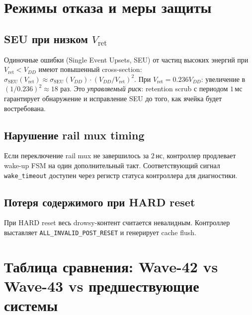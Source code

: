 \section{Режимы отказа и меры защиты}
\label{sec:glava89-failure}

\subsection{SEU при низком $V_\mathrm{ret}$}

Одиночные ошибки (Single Event Upsets, SEU)
от частиц высоких энергий при $V_\mathrm{ret} < V_{DD}$
имеют повышенный cross-section:
$\sigma_\mathrm{SEU}(V_\mathrm{ret}) \approx \sigma_\mathrm{SEU}(V_{DD}) \cdot (V_{DD}/V_\mathrm{ret})^2$.
При $V_\mathrm{ret} = 0.236 V_{DD}$: увеличение в $(1/0.236)^2 \approx 18$ раз.
Это \emph{управляемый риск}: retention scrub с периодом $1\,\text{мс}$
гарантирует обнаружение и исправление SEU
до того, как ячейка будет востребована.

\subsection{Нарушение rail mux timing}

Если переключение rail mux не завершилось за $2\,\text{нс}$,
контроллер продлевает wake-up FSM на один дополнительный такт.
Соответствующий сигнал \texttt{wake\_timeout} доступен
через регистр статуса контроллера для диагностики.

\subsection{Потеря содержимого при HARD reset}

При HARD reset весь drowsy-контент считается невалидным.
Контроллер выставляет \texttt{ALL\_INVALID\_POST\_RESET}
и генерирует cache flush.

\section{Таблица сравнения: Wave-42 vs Wave-43 vs предшествующие системы}
\label{sec:glava89-comparison}

